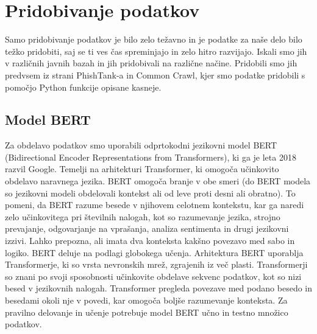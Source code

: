 \documentclass[sigconf,nonacm]{acmart}
\begin{document}
\section{Pridobivanje podatkov}
Samo pridobivanje podatkov je bilo zelo težavno in je podatke za naše delo bilo težko pridobiti, saj se ti ves čas spreminjajo in zelo hitro razvijajo. Iskali smo jih v različnih javnih bazah in jih pridobivali na različne načine. Pridobili smo jih predvsem iz strani PhishTank-a in  Common Crawl, kjer smo podatke pridobili s pomočjo Python funkcije opisane kasneje.
\subsection{Model BERT}
Za obdelavo podatkov smo uporabili odprtokodni jezikovni model BERT (Bidirectional Encoder Representations from Transformers), ki ga je leta 2018 razvil Google. Temelji na arhitekturi Transformer, ki omogoča učinkovito obdelavo naravnega jezika. BERT omogoča branje v obe smeri (do BERT modela so jezikovni modeli obdelovali kontekst ali od leve proti desni ali obratno). To pomeni, da BERT razume besede v njihovem celotnem kontekstu, kar ga naredi zelo učinkovitega pri številnih nalogah, kot so razumevanje jezika, strojno prevajanje, odgovarjanje na vprašanja, analiza sentimenta in drugi jezikovni izzivi. Lahko prepozna, ali imata dva konteksta kakšno povezavo med sabo in logiko. BERT deluje na podlagi globokega učenja. Arhitektura BERT uporablja Transformerje, ki so vrsta nevronskih mrež, zgrajenih iz več plasti. Transformerji so znani po svoji sposobnosti učinkovite obdelave sekvenc podatkov, kot so nizi besed v jezikovnih nalogah. Transformer pregleda povezave med podano besedo in besedami okoli nje v povedi, kar omogoča boljše razumevanje konteksta. Za pravilno delovanje in učenje potrebuje model BERT učno in testno množico podatkov.
\end{document}
